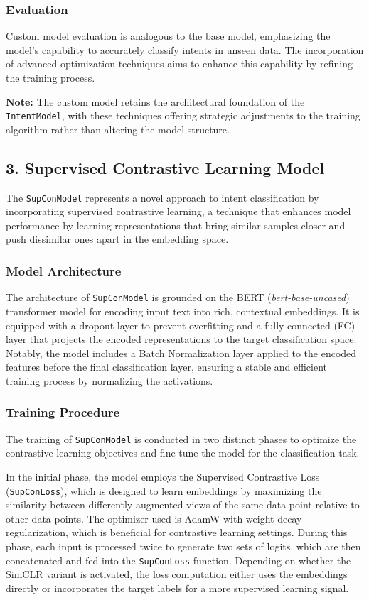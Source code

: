 \subsubsection*{Evaluation}
Custom model evaluation is analogous to the base model, emphasizing the model's capability to accurately classify intents in unseen data. The incorporation of advanced optimization techniques aims to enhance this capability by refining the training process.

\textbf{Note:} The custom model retains the architectural foundation of the \texttt{IntentModel}, with these techniques offering strategic adjustments to the training algorithm rather than altering the model structure.


\subsection*{3. Supervised Contrastive Learning Model}

The \texttt{SupConModel} represents a novel approach to intent classification by incorporating supervised contrastive learning, a technique that enhances model performance by learning representations that bring similar samples closer and push dissimilar ones apart in the embedding space.

\subsubsection*{Model Architecture}
The architecture of \texttt{SupConModel} is grounded on the BERT (\textit{bert-base-uncased}) transformer model for encoding input text into rich, contextual embeddings. It is equipped with a dropout layer to prevent overfitting and a fully connected (FC) layer that projects the encoded representations to the target classification space. Notably, the model includes a Batch Normalization layer applied to the encoded features before the final classification layer, ensuring a stable and efficient training process by normalizing the activations.

\subsubsection*{Training Procedure}
The training of \texttt{SupConModel} is conducted in two distinct phases to optimize the contrastive learning objectives and fine-tune the model for the classification task.

In the initial phase, the model employs the Supervised Contrastive Loss (\texttt{SupConLoss}), which is designed to learn embeddings by maximizing the similarity between differently augmented views of the same data point relative to other data points. The optimizer used is AdamW with weight decay regularization, which is beneficial for contrastive learning settings. During this phase, each input is processed twice to generate two sets of logits, which are then concatenated and fed into the \texttt{SupConLoss} function. Depending on whether the SimCLR variant is activated, the loss computation either uses the embeddings directly or incorporates the target labels for a more supervised learning signal.

